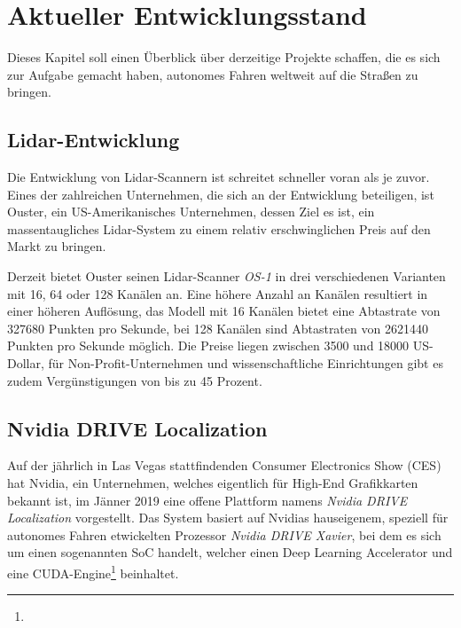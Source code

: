 \chapter{Aktueller Entwicklungsstand}

Dieses Kapitel soll einen Überblick über derzeitige Projekte schaffen, die es sich zur Aufgabe gemacht haben, autonomes Fahren weltweit auf die Straßen zu bringen.

\section{\acs{Lidar}-Entwicklung}

Die Entwicklung von Lidar-Scannern ist schreitet schneller voran als je zuvor. Eines der zahlreichen Unternehmen, die sich an der Entwicklung beteiligen, ist Ouster, ein US-Amerikanisches Unternehmen, dessen Ziel es ist, ein massentaugliches Lidar-System zu einem relativ erschwinglichen Preis auf den Markt zu bringen. 

Derzeit bietet Ouster seinen \acs{Lidar}-Scanner \emph{OS-1} in drei verschiedenen Varianten mit 16, 64 oder 128 Kanälen an. Eine höhere Anzahl an Kanälen resultiert in einer höheren Auflösung, das Modell mit 16 Kanälen bietet eine Abtastrate von \num{327680} Punkten pro Sekunde, bei 128 Kanälen sind Abtastraten von \num{2621440} Punkten pro Sekunde möglich. Die Preise liegen zwischen \num{3500} und \num{18000} US-Dollar, für Non-Profit-Unternehmen und wissenschaftliche Einrichtungen gibt es zudem Vergünstigungen von bis zu 45 Prozent. 


\section{Nvidia DRIVE Localization}

Auf der jährlich in Las Vegas stattfindenden Consumer Electronics Show (CES) hat Nvidia, ein Unternehmen, welches eigentlich für High-End Grafikkarten bekannt ist, im Jänner 2019 eine offene Plattform namens \emph{Nvidia DRIVE Localization} vorgestellt. Das System basiert auf Nvidias hauseigenem, speziell für autonomes Fahren etwickelten Prozessor \emph{Nvidia DRIVE Xavier}, bei dem es sich um einen sogenannten \ac{SoC} handelt, welcher einen Deep Learning Accelerator und eine CUDA-Engine\footnote{} beinhaltet. 

